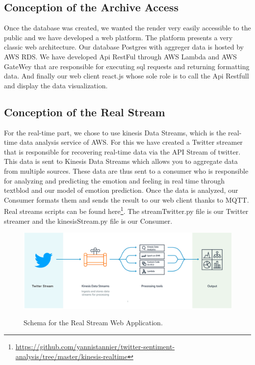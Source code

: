 \documentclass{acmtog} %
\begin{document}
\subsection{Conception of the Archive Access}
\label{subsub:conception_aa}

Once the database was created, we wanted the render very easily accessible to the public and we have developed a web platform.
The platform presents a very classic web architecture. Our database Postgres with aggreger data is hosted by AWS RDS.
We have developed Api RestFul through AWS Lambda and AWS GateWey that are responsible for executing sql requests and returning formatting data.
And finally our web client react.js whose sole role is to call the Api Restfull and display the data visualization.

\subsection{Conception of the Real Stream}
\label{subsub:conception_rs}

For the real-time part, we chose to use kinesis Data Streams, which is the real-time data analysis service of AWS.
For this we have created a Twitter streamer that is responsible for recovering real-time data via the API Stream of twitter. This data is sent to Kinesis Data Streams which allows you to aggregate data from multiple sources.
These data are thus sent to a consumer who is responsible for analyzing and predicting the emotion and feeling in real time through textblod and our model of emotion prediction.
Once the data is analyzed, our Consumer formats them and sends the result to our web client thanks to MQTT.
Real streams scripts can be found here\footnote{\url{https://github.com/yannistannier/twitter-sentiment-analysis/tree/master/kinesis-realtime}}.
The streamTwitter.py file is our Twitter streamer and the kinesisStream.py file is our Consumer.


\begin{figure}[H]
{\includegraphics[width=\linewidth]{real_stream-schema.png}}
\caption{Schema for the Real Stream Web Application.}
  \label{fig:archivers}
\end{figure}
\end{document}
